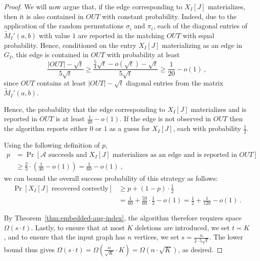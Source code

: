 \documentclass[11pt,a4paper]{article}
\begin{document}
\begin{proof}
We will now argue that, if the edge corresponding to $X_I[J]$ materializes, then it is also contained in $OUT$ with constant probability. Indeed, due to the application of the random permutations $\sigma_i$ and $\pi_i$, each of the diagonal entries of $\tilde{M}_I'(a,b)$ with value $1$ are reported in the matching $OUT$ with equal probability. Hence, conditioned on the entry $X_I[J]$ materializing as an edge in $G_I$, this edge is contained in $OUT$ with probability at least 
$$\frac{|OUT| - \sqrt{t}}{5 \sqrt{t}} \ge \frac{\frac{5}{4} \sqrt{t} - o(\sqrt{t}) - \sqrt{t}}{5 \sqrt{t} } \ge \frac{1}{20} - o(1) \ , $$ since $OUT$ contains at least $|OUT| - \sqrt{t}$ diagonal entries from the matrix $\tilde{M}_I'(a,b)$. 

Hence, the probability that the edge corresponding to $X_I[J]$ materializes and is reported in $OUT$ is at least $\frac{1}{40} - o(1)$. If the edge is not observed in $OUT$ then the algorithm reports either $0$  or $1$ as a guess for $X_I[J]$, each with probability $\frac{1}{2}$. 

Using the following definition of $p$,
\begin{align*}
    p & = \Pr[\mathcal{A} \mbox{ succeeds and } X_I[J] \mbox{ materializes as an edge and is reported in } OUT] \\
    & \ge \frac{2}{3} \cdot (\frac{1}{40}-o(1)) = \frac{1}{60} - o(1) \ ,    
\end{align*} 
we can bound the overall success probability of this strategy as follows:
\begin{align*}
  \Pr[X_I[J]  \mbox{ recovered correctly}] & 
  \ge p + (1-p) \cdot \frac{1}{2} \\
  & = \frac{1}{60} + \frac{59}{60} \cdot \frac{1}{2} - o(1)  = \frac{1}{2} + \frac{1}{120} - o(1) \ .
\end{align*}


By Theorem~\ref{thm:embedded-aug-index}, the algorithm therefore requires space $\Omega(s \cdot t)$. Lastly, to ensure that at most $K$ deletions are introduced, we set $t = K$, and to ensure that the input graph has $n$ vertices, we set $s = \frac{n}{2 \cdot 5 \sqrt{t}}$. The lower bound thus gives $\Omega(s \cdot t) = \Omega(\frac{n}{\sqrt{K}} \cdot K) = \Omega(n \cdot \sqrt{K})$, as desired.
\end{proof}
\end{document}
